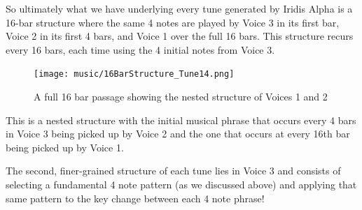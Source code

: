 So ultimately what we have underlying every tune generated by Iridis Alpha is a 16-bar structure where the same 4 notes
are played by Voice 3 in its first bar, Voice 2 in its first 4 bars, and Voice 1 over the full 16 bars. This structure recurs every
16 bars, each time using the 4 initial notes from Voice 3.

\begin{figure}[H]
{
  \begin{adjustbox}{width=13cm,center}
  \texttt{[image: music/16BarStructure\_Tune14.png]}%
    \end{adjustbox}
}\caption[]{A full 16 bar passage showing the nested structure of Voices 1 and 2}
\end{figure}

This is a nested structure with the initial musical phrase that occurs every 4 bars in Voice 3 being picked up by Voice 2 and the one
that occurs at every 16th bar being picked up by Voice 1.

The second, finer-grained structure of each tune lies in Voice 3 and consists of selecting a fundamental 4 note pattern (as we 
discussed above) and applying that same pattern to the key change between each 4 note phrase! 

